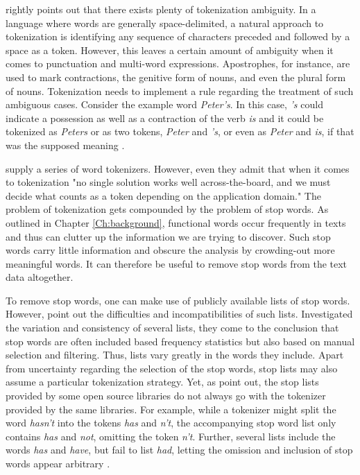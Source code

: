 \documentclass[11pt,a4paper,english,oneside]{book}
\numberwithin{equation}{chapter}
\begin{document}
\citet[pp. 16-19]{Palmer.2010} rightly points out that there exists plenty of tokenization ambiguity. In a language where words are generally space-delimited, a natural approach to tokenization is identifying any sequence of characters preceded and followed by a space as a token. However, this leaves a certain amount of ambiguity when it comes to punctuation and multi-word expressions. Apostrophes, for instance, are used to mark contractions, the genitive form of nouns, and even the plural form of nouns. Tokenization needs to implement a rule regarding the treatment of such ambiguous cases. Consider the example word \textit{Peter's}. In this case, \textit{'s} could indicate a possession as well as a contraction of the verb \textit{is} and it could be tokenized as \textit{Peters} or as two tokens, \textit{Peter} and \textit{'s}, or even as \textit{Peter} and \textit{is}, if that was the supposed meaning \cite[pp. 16-19]{Palmer.2010}.

\cite{Bird.2010} supply a series of word tokenizers. However, even they admit that when it comes to tokenization "no single solution works well across-the-board, and we must decide what counts as a token depending on the application domain." The problem of tokenization gets compounded by the problem of stop words. As outlined in Chapter \ref{Ch:background}, functional words occur frequently in texts and thus can clutter up the information we are trying to discover. Such stop words carry little information and obscure the analysis by crowding-out more meaningful words. It can therefore be useful to remove stop words from the text data altogether. 

To remove stop words, one can make use of publicly available lists of stop words. However, \citet{Nothman.2018} point out the difficulties and incompatibilities of such lists. Investigated the variation and consistency of several lists, they come to the conclusion that stop words are often included based frequency statistics but also based on manual selection and filtering. Thus, lists vary greatly in the words they include. Apart from uncertainty regarding the selection of the stop words, stop lists may also assume a particular tokenization strategy. Yet, as \citet{Nothman.2018} point out, the stop lists provided by some open source libraries do not always go with the tokenizer provided by the same libraries. For example, while a tokenizer might split the word \textit{hasn't} into the tokens \textit{has} and \textit{n't}, the accompanying stop word list only contains \textit{has} and \textit{not}, omitting the token \textit{n't}. Further, several lists include the words \textit{has} and \textit{have}, but fail to list \textit{had}, letting the omission and inclusion of stop words appear arbitrary \citep[p. 7--11]{Nothman.2018}.  
\end{document}
